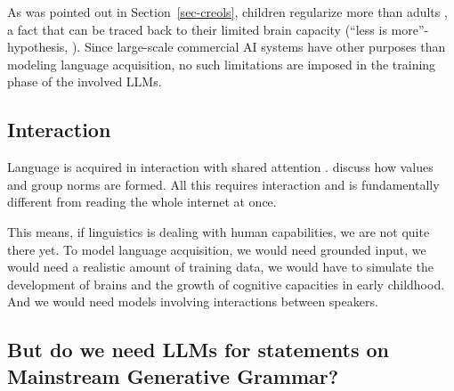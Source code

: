 As was pointed out in Section~\ref{sec-creols}, children regularize more than adults
\citep{HudsonN99a,HKN2005a}, a fact that can be traced back to their limited brain capacity (``less
is more''-hypothesis, \citealp{Newport90a,Elman93a}). Since large-scale commercial AI systems have other
purposes than modeling language acquisition, no such limitations are imposed in the training phase
of the involved LLMs.

\subsection{Interaction}

Language is acquired in interaction with shared attention
\parencites{Tomasello2003a}[134]{AL2011a-u,Clark2022a}[234]{Goldberg2024a}. \citet{CollinsThorneNewbury2026a} discuss
how values and group norms are formed. All this requires interaction and is fundamentally different
from reading the whole internet at once.

This means, if linguistics is dealing with human capabilities, we are not quite there yet. To
model language acquisition, we would need grounded input, we would need a realistic amount of
training data, we would have to simulate the development of brains and the growth of cognitive
capacities in early childhood. And we would need models involving interactions between speakers.



\subsection{But do we need LLMs for statements on Mainstream Generative Grammar?}

